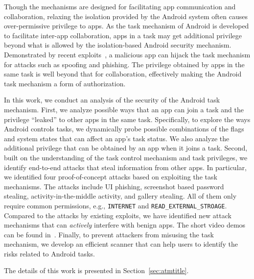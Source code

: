 \documentclass[letterpaper,12pt]{article}
\begin{document}
Though the mechanisms are designed for facilitating app communication
and collaboration, relaxing the isolation provided by the Android
system often causes over-permissive privilege to apps. 
As the task mechanism of Android is developed to facilitate inter-app
collaboration, apps in a task may get additional privilege beyond what
is allowed by the isolation-based Android security
mechanism. Demonstrated by recent exploits~\cite{TaskHijacking}, a
malicious app can hijack the task mechanism for attacks such as
spoofing and phishing. The privilege obtained by apps in the same task
is well beyond that for collaboration, effectively making the Android
task mechanism a form of authorization.

In this work, we conduct an analysis of the security of the Android
task mechanism. First, we analyze possible ways that an app can join a task
and the privilege ``leaked'' to other apps in the same
task. Specifically, to explore the ways Android controls tasks, we
dynamically probe possible combinations of the flags and system states
that can affect an app's task status.  We also analyze the additional
privilege that can be obtained by an app when it joins a task. Second, built on the understanding of the task control mechanism and task privileges, we identify end-to-end attacks that steal information from other apps. In particular, we identified four proof-of-concept attacks based on exploiting the task mechanisms. The attacks include
UI phishing, screenshot based password stealing, activity-in-the-middle
activity, and gallery stealing. All of them only require common
permissions, e.g., \texttt{INTERNET} and \texttt{READ\_EXTERNAL\_STROAGE}. Compared to
the attacks by existing exploits, we have identified new attack
mechanisms that can {\em actively} interfere with benign apps. The
short video demos can be found in~\cite{demo}. Finally, to prevent attackers from misusing the task mechanism, we develop an efficient scanner that can help users to
identify the risks related to Android tasks.

The details of this work is presented in Section~\ref{sec:atmtitle}. 
\end{document}

